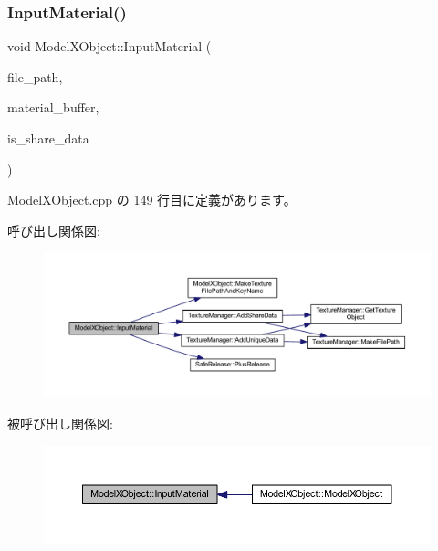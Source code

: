 \subsubsection{\texorpdfstring{Input\+Material()}{InputMaterial()}}
{\footnotesize\ttfamily void Model\+X\+Object\+::\+Input\+Material (\begin{DoxyParamCaption}\item[{const std\+::string $\ast$}]{file\+\_\+path,  }\item[{L\+P\+D3\+D\+X\+B\+U\+F\+F\+ER $\ast$}]{material\+\_\+buffer,  }\item[{bool}]{is\+\_\+share\+\_\+data }\end{DoxyParamCaption})\hspace{0.3cm}{\ttfamily [private]}}



 Model\+X\+Object.\+cpp の 149 行目に定義があります。

呼び出し関係図\+:\nopagebreak
\begin{figure}[H]
\begin{center}
\leavevmode
\includegraphics[width=350pt]{class_model_x_object_a612ecc2cb9b19ae1674dcc5ee8aab710_cgraph}
\end{center}
\end{figure}
被呼び出し関係図\+:\nopagebreak
\begin{figure}[H]
\begin{center}
\leavevmode
\includegraphics[width=350pt]{class_model_x_object_a612ecc2cb9b19ae1674dcc5ee8aab710_icgraph}
\end{center}
\end{figure}
\mbox{\label{class_model_x_object_ac7a86f4d034600ae5d8f8fd3610f4628}} 
